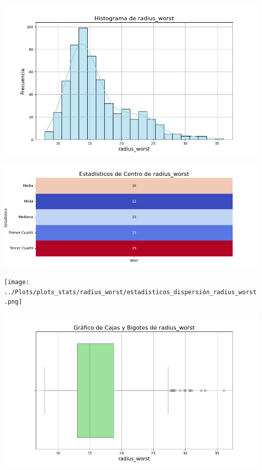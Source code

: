 \documentclass[a4paper, 12pt]{article}
\begin{document}
	\includegraphics[width=\textwidth]{../Plots/plots_stats/radius_worst/histograma_radius_worst.png}




\includegraphics[width=\textwidth]{../Plots/plots_stats/radius_worst/estadisticas_centro_radius_worst.png}




\texttt{[image: ../Plots/plots\_stats/radius\_worst/estadisticos\_dispersión\_radius\_worst.png]}



\includegraphics[width=\textwidth]{../Plots/plots_stats/radius_worst/boxplot_radius_worst.png}
\end{document}
